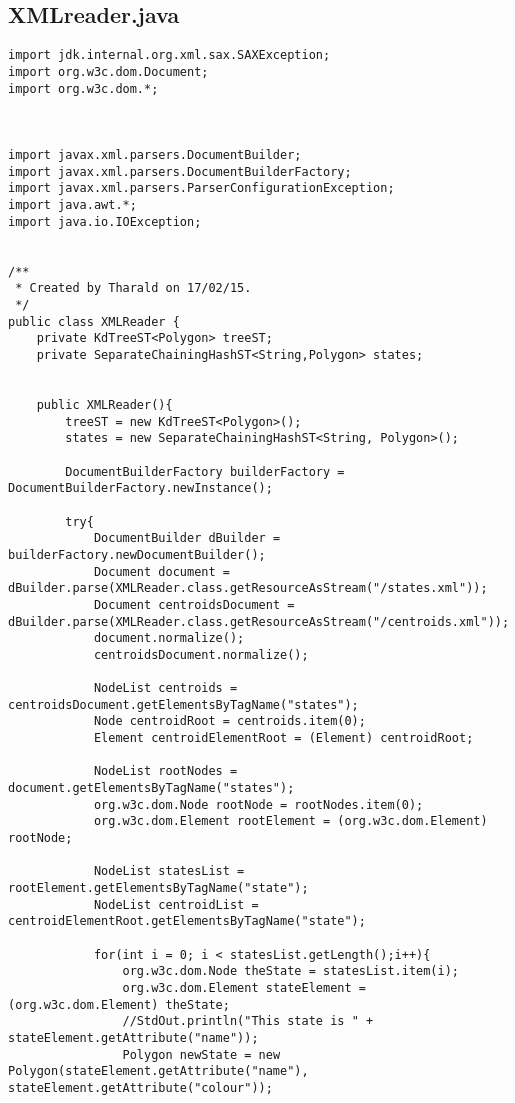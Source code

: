 \subsection{XMLreader.java}
\begin{verbatim}
import jdk.internal.org.xml.sax.SAXException;
import org.w3c.dom.Document;
import org.w3c.dom.*;



import javax.xml.parsers.DocumentBuilder;
import javax.xml.parsers.DocumentBuilderFactory;
import javax.xml.parsers.ParserConfigurationException;
import java.awt.*;
import java.io.IOException;


/**
 * Created by Tharald on 17/02/15.
 */
public class XMLReader {
    private KdTreeST<Polygon> treeST;
    private SeparateChainingHashST<String,Polygon> states;


    public XMLReader(){
        treeST = new KdTreeST<Polygon>();
        states = new SeparateChainingHashST<String, Polygon>();

        DocumentBuilderFactory builderFactory = DocumentBuilderFactory.newInstance();

        try{
            DocumentBuilder dBuilder = builderFactory.newDocumentBuilder();
            Document document = dBuilder.parse(XMLReader.class.getResourceAsStream("/states.xml"));
            Document centroidsDocument = dBuilder.parse(XMLReader.class.getResourceAsStream("/centroids.xml"));
            document.normalize();
            centroidsDocument.normalize();

            NodeList centroids = centroidsDocument.getElementsByTagName("states");
            Node centroidRoot = centroids.item(0);
            Element centroidElementRoot = (Element) centroidRoot;

            NodeList rootNodes = document.getElementsByTagName("states");
            org.w3c.dom.Node rootNode = rootNodes.item(0);
            org.w3c.dom.Element rootElement = (org.w3c.dom.Element) rootNode;

            NodeList statesList = rootElement.getElementsByTagName("state");
            NodeList centroidList = centroidElementRoot.getElementsByTagName("state");

            for(int i = 0; i < statesList.getLength();i++){
                org.w3c.dom.Node theState = statesList.item(i);
                org.w3c.dom.Element stateElement = (org.w3c.dom.Element) theState;
                //StdOut.println("This state is " + stateElement.getAttribute("name"));
                Polygon newState = new Polygon(stateElement.getAttribute("name"), stateElement.getAttribute("colour"));


\end{verbatim}
